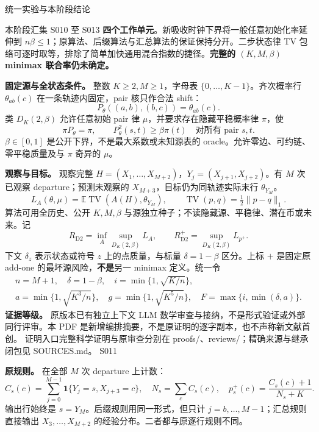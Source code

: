 \documentclass[11pt,a4paper]{article}
\newcommand{\TV}{\operatorname{TV}}\newcommand{\E}{\mathbb E}
\newcommand{\R}{R_{\mathrm{D2}}}\newcommand{\Rp}{R_{\mathrm{D2}}^{+}}
\newcommand{\dd}{\delta}
\newcommand{\head}[2]{{\small\sffamily #1}\par\vspace{2pt}{\LARGE\bfseries #2}\par\vspace{5pt}}
\newcommand{\entry}[1]{\vfill\noindent\small 证明入口\quad #1\normalsize}
\begin{document}
\head{统一实验与本阶段结论}{弱混合下界推进但联合率仍未闭合}
本阶段汇集 S010 至 S013 \textbf{四个工作单元}。新吸收时钟下界将一般任意初始化率延伸到 $n\beta\le1$；原算法、后缀算法与汇总算法的保证保持分开。二步状态律 TV 包络可逐时取等，排除了简单加快通用混合指数的捷径。\textbf{完整的 $(K,M,\beta)$ minimax 联合率仍未确定。}

\textbf{固定源与全状态条件。} 整数 $K\ge2,M\ge1$，字母表 $\{0,\ldots,K-1\}$。齐次概率行 $\theta_{ab}(c)$ 在一条轨迹内固定，pair 核只作合法 shift：
\[
 P_\theta((a,b),(b,c))=\theta_{ab}(c).
\]
类 $D_K(2,\beta)$ 允许任意初始 pair 律 $\mu$，并要求存在隐藏平稳概率律 $\pi$，使
\[
 \pi P_\theta=\pi,\qquad P_\theta^2(s,t)\ge\beta\pi(t)\quad\text{对所有 pair }s,t.
\]
$\beta\in[0,1]$ 是公开下界，不是最大系数或未知源表的 oracle。允许零边、可约链、零平稳质量及与 $\pi$ 奇异的 $\mu$。

\textbf{观察与目标。} 观察完整 $H=(X_1,\ldots,X_{M+2})$，$Y_j=(X_{j+1},X_{j+2})$。有 $M$ 次已观察 departure；预测未观察的 $X_{M+3}$，目标仍为同轨迹实际末行 $\theta_{Y_M}$。
\[
 L_A(\theta,\mu)=\E\TV(A(H),\theta_{Y_M}),\qquad
 \TV(p,q)=\tfrac12\|p-q\|_1.
\]
算法可用全历史、公开 $K,M,\beta$ 与源独立种子；不读隐藏源、平稳律、潜在币或未来。记
\[
 \R=\inf_A\sup_{D_K(2,\beta)}L_A,\qquad
 \Rp=\sup_{D_K(2,\beta)}L_{p^+}.
\]
下文 $\delta_z$ 表示状态或符号 $z$ 上的点质量，与标量 $\dd=1-\beta$ 区分。上标 $+$ 是固定原 add-one 的最坏源风险，\textbf{不是}另一 minimax 定义。统一令
\[
 \begin{gathered}
 n=M+1,\quad\dd=1-\beta,\quad i=\min\{1,\sqrt{K/n}\},\\
 a=\min\{1,\sqrt{K^3/n}\},\quad g=\min\{1,\sqrt{K^5/n}\},\quad
 F=\max\{i,\min(\dd,a)\}.
 \end{gathered}
\]
\textbf{证据等级。} 原版本已有独立上下文 LLM 数学审查与接纳，不是形式验证或外部同行评审。本 PDF 是新增编排摘要，不是原证明的逐字副本，也不声称新文献首创。
\entry{完整科学证明与原审查分别在 proofs/、reviews/；精确来源与继承闭包见 SOURCES.md。}
\newpage
\head{S011}{三个算法的公开证书不能混用}
\textbf{原规则。} 在全部 $M$ 次 departure 上计数：
\[
 C_s(c)=\sum_{j=0}^{M-1}\mathbf1\{Y_j=s,X_{j+3}=c\},\quad
 N_s=\sum_c C_s(c),\quad p_s^+(c)=\frac{C_s(c)+1}{N_s+K}.
\]
输出行始终是 $s=Y_M$。后缀规则用同一形式，但只计 $j=b,\ldots,M-1$；汇总规则直接输出 $X_3,\ldots,X_{M+2}$ 的经验分布。二者都与原逐行规则不同。
\end{document}
